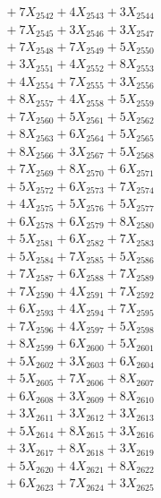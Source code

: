 \documentclass[a4paper,10pt]{article}
\begin{document}
{\begin{align}
&\;  + 7 X_{2542} + 4 X_{2543} + 3 X_{2544} \\[0.3ex]
&\;  + 7 X_{2545} + 3 X_{2546} + 3 X_{2547} \\[0.3ex]
&\;  + 7 X_{2548} + 7 X_{2549} + 5 X_{2550} \\[0.3ex]
&\;  + 3 X_{2551} + 4 X_{2552} + 8 X_{2553} \\[0.3ex]
&\;  + 4 X_{2554} + 7 X_{2555} + 3 X_{2556} \\[0.3ex]
&\;  + 8 X_{2557} + 4 X_{2558} + 5 X_{2559} \\[0.5ex]\allowbreak
&\;  + 7 X_{2560} + 5 X_{2561} + 5 X_{2562} \\[0.3ex]
&\;  + 8 X_{2563} + 6 X_{2564} + 5 X_{2565} \\[0.3ex]
&\;  + 8 X_{2566} + 3 X_{2567} + 5 X_{2568} \\[0.3ex]
&\;  + 7 X_{2569} + 8 X_{2570} + 6 X_{2571} \\[0.3ex]
&\;  + 5 X_{2572} + 6 X_{2573} + 7 X_{2574} \\[0.3ex]
&\;  + 4 X_{2575} + 5 X_{2576} + 5 X_{2577} \\[0.3ex]
&\;  + 6 X_{2578} + 6 X_{2579} + 8 X_{2580} \\[0.3ex]
&\;  + 5 X_{2581} + 6 X_{2582} + 7 X_{2583} \\[0.3ex]
&\;  + 5 X_{2584} + 7 X_{2585} + 5 X_{2586} \\[0.3ex]
&\;  + 7 X_{2587} + 6 X_{2588} + 7 X_{2589} \\[0.5ex]\allowbreak
&\;  + 7 X_{2590} + 4 X_{2591} + 7 X_{2592} \\[0.3ex]
&\;  + 6 X_{2593} + 4 X_{2594} + 7 X_{2595} \\[0.3ex]
&\;  + 7 X_{2596} + 4 X_{2597} + 5 X_{2598} \\[0.3ex]
&\;  + 8 X_{2599} + 6 X_{2600} + 5 X_{2601} \\[0.3ex]
&\;  + 5 X_{2602} + 3 X_{2603} + 6 X_{2604} \\[0.3ex]
&\;  + 5 X_{2605} + 7 X_{2606} + 8 X_{2607} \\[0.3ex]
&\;  + 6 X_{2608} + 3 X_{2609} + 8 X_{2610} \\[0.3ex]
&\;  + 3 X_{2611} + 3 X_{2612} + 3 X_{2613} \\[0.3ex]
&\;  + 5 X_{2614} + 8 X_{2615} + 3 X_{2616} \\[0.3ex]
&\;  + 3 X_{2617} + 8 X_{2618} + 3 X_{2619} \\[0.5ex]\allowbreak
&\;  + 5 X_{2620} + 4 X_{2621} + 8 X_{2622} \\[0.3ex]
&\;  + 6 X_{2623} + 7 X_{2624} + 3 X_{2625} \\[0.3ex]

\end{align}}
\end{document}
